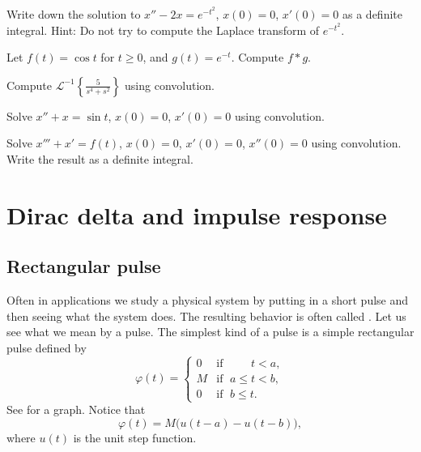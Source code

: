 \begin{exercise}
Write down the solution to
$x''-2x=e^{-t^2}$, $x(0)=0$, $x'(0)=0$ as a
definite integral.  Hint: Do not try to compute the
Laplace transform of $e^{-t^2}$.
\end{exercise}

\setcounter{exercise}{100}

\begin{exercise}
Let $f(t) = \cos t$ for $t \geq 0$, and $g(t) = e^{-t}$.  Compute
$f * g$.
\end{exercise}

\begin{exercise}
Compute ${\mathcal{L}}^{-1} \left\{ \frac{5}{s^4+s^2} \right\}$ using
convolution.
\end{exercise}


\begin{exercise}
Solve $x''+x = \sin t$, $x(0) = 0$, $x'(0)=0$ using convolution.
\end{exercise}

\begin{exercise}
Solve $x'''+x' = f(t)$, $x(0) = 0$, $x'(0)=0$, $x''(0)=0$ using convolution.
Write the result as a definite integral.
\end{exercise}



\sectionnewpage
\section{Dirac delta and impulse response}
\label{diracdelta:section}


\subsection{Rectangular pulse}

Often in applications we study a physical system by putting in a short pulse 
and then seeing what the system does.  The resulting behavior is
often called \emph{}.
Let us see what we mean by a pulse.
The simplest kind of a pulse is a simple rectangular pulse defined by
\begin{equation*}
\varphi(t) = 
\begin{cases}
0 & \text{if } \; \phantom{a \leq {}} t < a , \\
M & \text{if } \; a \leq t < b , \\
0 & \text{if } \; b \leq t .
\end{cases}
\end{equation*}
See  for a graph.
Notice that
\begin{equation*}
\varphi(t) = M \bigl( u(t-a) - u(t-b) \bigr) ,
\end{equation*}
where $u(t)$ is the unit step function.

